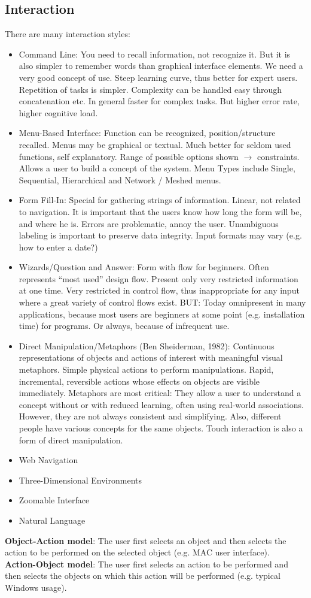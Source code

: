 \subsection{Interaction}
There are many interaction styles: 
\begin{itemize}
\item Command Line: You need to recall information, not recognize it. But it is also simpler to remember words than graphical interface elements. We need a very good concept of use. Steep learning curve, thus better for expert users. Repetition of tasks is simpler. Complexity can be handled easy through concatenation etc. In general faster for complex tasks. But higher error rate, higher cognitive load.
\item Menu-Based Interface: Function can be recognized, position/structure recalled. Menus may be graphical or textual. Much better for seldom used functions, self explanatory. Range of possible options shown $\rightarrow$ constraints. Allows a user to build a concept of the system. Menu Types include Single, Sequential, Hierarchical and Network / Meshed menus.
\item Form Fill-In: Special for gathering strings of information. Linear, not related to navigation. It is important that the users know how long the form will be, and where he is. Errors are problematic, annoy the user. Unambiguous labeling is important to preserve data integrity. Input formats may vary (e.g. how to enter a date?)
\item Wizards/Question and Answer: Form with flow for beginners. Often represents ``most used'' design flow. Present only very restricted information at one time. Very restricted in control flow, thus inappropriate for any input where a great variety of control flows exist. BUT: Today omnipresent in many applications, because most users are beginners at some point (e.g. installation time) for programs. Or always, because of infrequent use.
\item Direct Manipulation/Metaphors (Ben Sheiderman, 1982): Continuous representations of objects and actions of interest with meaningful visual metaphors. Simple physical actions to perform manipulations. Rapid, incremental, reversible actions whose effects on objects are visible immediately. Metaphors are most critical: They allow a user to understand a concept without or with reduced learning, often using real-world associations. However, they are not always consistent and simplifying. Also, different people have various concepts for the same objects. Touch interaction is also a form of direct manipulation.
\item Web Navigation
\item Three-Dimensional Environments
\item Zoomable Interface
\item Natural Language
\end{itemize}
\textbf{Object-Action model}: The user first selects an object and then selects the action to be performed on the selected object (e.g. MAC user interface).\\
\textbf{Action-Object model}: The user first selects an action to be performed and then selects the objects on which this action will be performed (e.g. typical Windows usage).